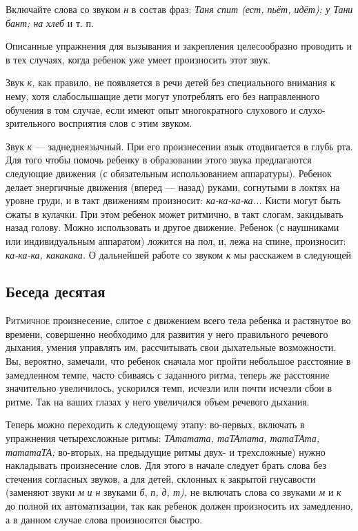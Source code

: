 \documentclass{book}
\renewcommand{\emph}[1]{\textit{#1}}
\begin{document}
Включайте слова со звуком \emph{н} в состав фраз: \emph{Таня спит (ест,
пьёт, идёт); у Тани бант; на хлеб} и т. п.

Описанные упражнения для вызывания и закрепления целесообразно проводить
и в тех случаях, когда ребенок уже умеет произносить этот звук.

Звук \emph{к,} как правило, не появляется в речи детей без специального
внимания к нему, хотя слабослышащие дети могут употреблять его без
направленного обучения в том случае, если имеют опыт многократного
слухового и слухо-зрительного восприятия слов с этим звуком.

Звук \emph{к} --- заднеднеязычный. При его произнесении язык
отодвигается в глубь рта. Для того чтобы помочь ребенку в образовании
этого звука предлагаются следующие движения (с обязательным
использованием аппаратуры). Ребенок делает энергичные движения (вперед
--- назад) руками, согнутыми в локтях на уровне груди, и в такт
движениям произносит: \emph{ка-ка-ка-ка...} Кисти могут быть сжаты в
кулачки. При этом ребенок может ритмично, в такт слогам, закидывать
назад голову. Можно использовать и другое движение. Ребенок (с
наушниками или индивидуальным аппаратом) ложится на пол, и, лежа на
спине, произносит: \emph{ка-ка-ка, какакака.} О дальнейшей работе со
звуком \emph{к} мы расскажем в следующей

\subsection*{Беседа десятая}

\textsc{Ритмичное} произнесение, слитое с движением всего тела ребенка и
растянутое во времени, совершенно необходимо для развития у него
правильного речевого дыхания, умения управлять им, рассчитывать свои
дыхательные возможности. Вы, вероятно, замечали, что ребенок сначала мог
пройти небольшое расстояние в замедленном темпе, часто сбиваясь с
заданного ритма, теперь же расстояние значительно увеличилось, ускорился
темп, исчезли или почти исчезли сбои в ритме. Так на ваших глазах у него
увеличился объем речевого дыхания.

Теперь можно переходить к следующему этапу: во-первых, включать в
упражнения четырехсложные ритмы: \emph{ТАтатата, таТАтата, татаТАта,
тататаТА;} во-вторых, на предыдущие ритмы двух- и трехсложные) нужно
накладывать произнесение слов. Для этого в начале следует брать слова
без стечения согласных звуков, а для детей, склонных к закрытой
гнусавости (заменяют звуки \emph{м} \emph{и н} звуками \emph{б},
\emph{п, д, т),} не включать слова со звуками \emph{м} и \emph{к} до
полной их автоматизации, так как ребенок должен произносить их
замедленно, а в данном случае слова произносятся быстро.
\end{document}
